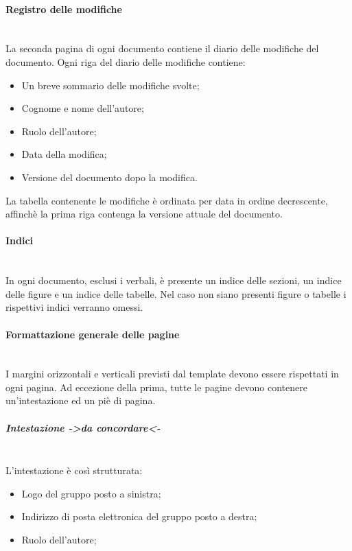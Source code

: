 		\paragraph{Registro delle modifiche} \mbox{} \\
		La seconda pagina di ogni documento contiene il diario delle modifiche del documento.
		Ogni riga del diario delle modifiche contiene:
		\begin{itemize}
			\item Un breve sommario delle modifiche svolte;
			\item Cognome e nome dell’autore;
			\item Ruolo dell’autore;
			\item Data della modifica;
			\item Versione del documento dopo la modifica.
		\end{itemize}
		La tabella contenente le modifiche è ordinata per data in ordine decrescente, affinchè la prima riga contenga la versione attuale del documento.
		
		\paragraph{Indici} \mbox{} \\
		In ogni documento, esclusi i verbali, è presente un indice delle sezioni, un indice delle figure e un indice delle tabelle. Nel caso non siano presenti figure o tabelle i rispettivi indici verranno omessi.
		
		\paragraph{Formattazione generale delle pagine} \mbox{} \\
		I margini orizzontali e verticali previsti dal template devono essere rispettati in ogni pagina. Ad eccezione della prima, tutte le pagine devono contenere un’intestazione ed un piè di pagina. 
			
			\subparagraph{Intestazione ->da concordare<-} \mbox{} \\
			L’intestazione è così strutturata:
			\begin{itemize}
				\item Logo del gruppo posto a sinistra;
				\item Indirizzo di posta elettronica del gruppo posto a destra;
				\item Ruolo dell’autore;
			\end{itemize}
			

